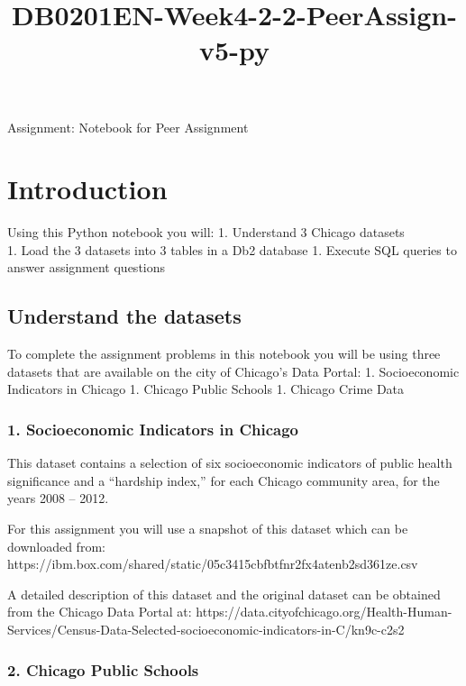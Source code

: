 \documentclass[11pt]{article}
\title{DB0201EN-Week4-2-2-PeerAssign-v5-py}
\begin{document}
    
    
    \maketitle
    
    

    
    Assignment: Notebook for Peer Assignment

    \section{Introduction}\label{introduction}

Using this Python notebook you will: 1. Understand 3 Chicago datasets\\
1. Load the 3 datasets into 3 tables in a Db2 database 1. Execute SQL
queries to answer assignment questions

    \subsection{Understand the datasets}\label{understand-the-datasets}

To complete the assignment problems in this notebook you will be using
three datasets that are available on the city of Chicago's Data Portal:
1. Socioeconomic Indicators in Chicago 1. Chicago Public Schools 1.
Chicago Crime Data

\subsubsection{1. Socioeconomic Indicators in
Chicago}\label{socioeconomic-indicators-in-chicago}

This dataset contains a selection of six socioeconomic indicators of
public health significance and a ``hardship index,'' for each Chicago
community area, for the years 2008 -- 2012.

For this assignment you will use a snapshot of this dataset which can be
downloaded from:
https://ibm.box.com/shared/static/05c3415cbfbtfnr2fx4atenb2sd361ze.csv

A detailed description of this dataset and the original dataset can be
obtained from the Chicago Data Portal at:
https://data.cityofchicago.org/Health-Human-Services/Census-Data-Selected-socioeconomic-indicators-in-C/kn9c-c2s2

\subsubsection{2. Chicago Public Schools}\label{chicago-public-schools}
\end{document}
